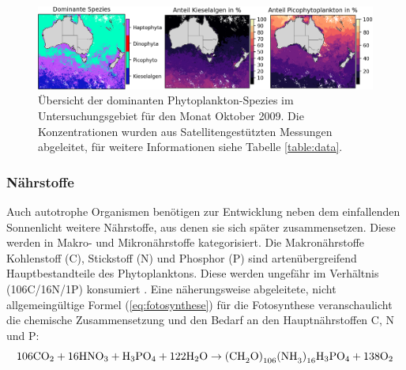 \documentclass[12pt,a4paper,onecolumn]{scrartcl}
\newcommand{\cotwo}{CO\textsubscript{2}}
\begin{document}
\begin{figure}[!htb]
\includegraphics[width=\textwidth]{bilder/dominant_diatom_pico.png}
\caption{Übersicht der dominanten Phytoplankton-Spezies im Untersuchungsgebiet für den Monat Oktober 2009. Die Konzentrationen wurden aus Satellitengestützten Messungen abgeleitet, für weitere Informationen siehe Tabelle \ref{table:data}.} \label{fig:dominant_diatom_pico}
\end{figure}
\subsubsection{Nährstoffe} \label{sec:nährstoffe}
Auch autotrophe Organismen benötigen zur Entwicklung neben dem einfallenden Sonnenlicht weitere Nährstoffe, aus denen sie sich später zusammensetzen. Diese werden in Makro- und Mikronährstoffe kategorisiert. Die Makronährstoffe Kohlenstoff (C), Stickstoff (N) und Phosphor (P) sind artenübergreifend  Hauptbestandteile des Phytoplanktons. Diese werden ungefähr im Verhältnis (106C/16N/1P) konsumiert \citep{Falkowski.1998}. Eine näherungsweise abgeleitete, nicht allgemeingültige Formel (\ref{eq:fotosynthese}) für die Fotosynthese  \citep{Emerson.2009} veranschaulicht die chemische Zusammensetzung und den Bedarf an den Hauptnährstoffen C, N und P:
\begin{equation}
\text{106\cotwo} + \text{16HNO}_3 + \text{H}_3\text{PO}_4 + \text{122H}_2\text{O} \rightarrow \text{(CH}_2\text{O)}_{106}\text{(NH}_3\text{)}_{16}\text{H}_3\text{PO}_4 + \text{138O}_2 \label{eq:fotosynthese}
\end{equation}
\end{document}
